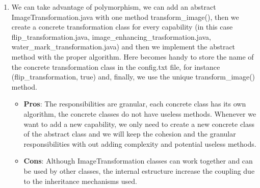 \begin{enumerate}
  \item We can take advantage of polymorphism, we can add an abstract ImageTransformation.java with one method transform\_image(), then we create a concrete transformation class for every capability (in this case flip\_transformation.java, image\_enhancing\_trasformation.java, water\_mark\_transformation.java) and then we implement the abstract method with the proper algorithm. Here becomes handy to store the name of the concrete transformation class in the config.txt file, for instance (flip\_transformation, true) and, finally, we use the unique transform\_image() method.
    \begin{itemize}
     \item \textbf{Pros}: The responsibilities are granular, each concrete class has its own algorithm, the concrete classes do not have useless methods. Whenever we want to add a new capability, we only need to create a new concrete class of the abstract class and we will keep the cohesion and the granular responsibilities with out adding complexity and potential useless methods.  
     \item \textbf{Cons}: Although ImageTransformation classes can work together and can be used by other classes, the internal estructure increase the coupling due to the inheritance mechanisms used.
   \end{itemize}
\end{enumerate}